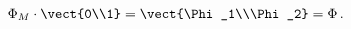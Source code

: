 \begin{equation}
\Phi_M \cdot \vect{0\\1} = \vect{\Phi_1\\\Phi_2} = \Phi \,. \label{PhiMdef}
\end{equation}

